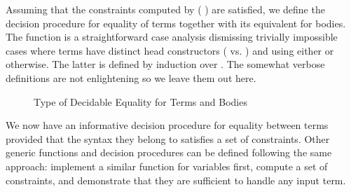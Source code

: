 Assuming that the constraints computed by {( )} are
satisfied, we define the decision procedure for equality of terms together
with its equivalent for bodies. The function 
is a straightforward case analysis dismissing trivially impossible cases
where terms have distinct head constructors ( vs. )
and using either  or 
otherwise. The latter is defined by induction over . The somewhat
verbose definitions are not enlightening so we leave them out here.


\begin{figure}[h]
\caption{Type of Decidable Equality for Terms and Bodies}\label{fig:eqtype}
\end{figure}

We now have an informative decision procedure for equality between terms
provided that the syntax they belong to satisfies a set of constraints.
Other generic functions and decision procedures can be defined
following the same approach: implement a similar function for variables
first, compute a set of constraints, and demonstrate that they are
sufficient to handle any input term.
